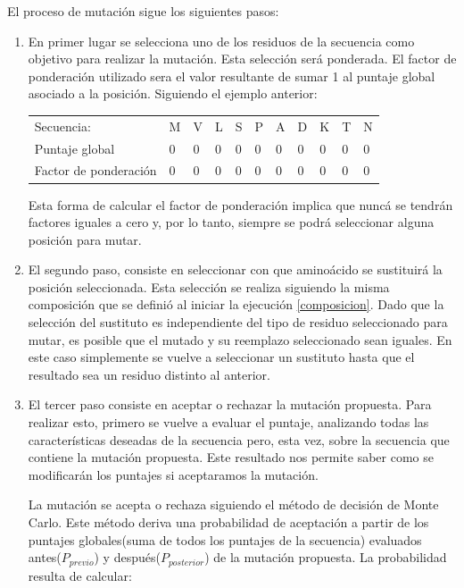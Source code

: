 \vspace{0.5cm}
El proceso de mutación sigue los siguientes pasos:
\begin{enumerate}
 \item En primer lugar se selecciona uno de los residuos de la secuencia como objetivo para realizar la mutación. 
 Esta selección será ponderada. El factor de ponderación utilizado sera el valor resultante de sumar 1 al puntaje global asociado a la posición.
 Siguiendo el ejemplo anterior:
 
 \begin{tabular}{lllllllllll} 
Secuencia: &  M & V & L & S & P & A & D & K & T & N\\ 
Puntaje global & 0 & 0 & 0 & 0 & 0 & 0 & 0 & 0 & 0 & 0\\
Factor de ponderación & 0 & 0 & 0 & 0 & 0 & 0 & 0 & 0 & 0 & 0\\
\end{tabular}
 
\vspace{0.5cm}
Esta forma de calcular el factor de ponderación implica que nuncá se tendrán factores iguales a cero y, por lo tanto, siempre se podrá seleccionar alguna posición para mutar.

   \item El segundo paso, consiste en seleccionar con que aminoácido se sustituirá la posición seleccionada. 
   Esta selección se realiza siguiendo la misma composición que se definió al iniciar la ejecución \ref{composicion}. 
   Dado que la selección del sustituto es independiente del tipo de residuo seleccionado para mutar,
   es posible que el mutado y su reemplazo seleccionado sean iguales. 
   En este caso simplemente se vuelve a seleccionar un sustituto hasta que el resultado sea un residuo distinto al anterior.     
    \item El tercer paso consiste en aceptar o rechazar la mutación propuesta.
    Para realizar esto, primero se vuelve a evaluar el puntaje, analizando todas las características deseadas de la secuencia pero, esta vez, sobre la secuencia que contiene la mutación propuesta.
    Este resultado nos permite saber como se modificarán los puntajes si aceptaramos la mutación.
    
    La mutación se acepta o rechaza siguiendo el método de decisión de Monte Carlo. 
    Este método deriva una probabilidad de aceptación a partir de los puntajes globales(suma de todos los puntajes de la secuencia) evaluados antes($P_{previo}$) y después($P_{posterior}$) de la mutación propuesta.
    La probabilidad resulta de calcular:
    

\end{enumerate}
